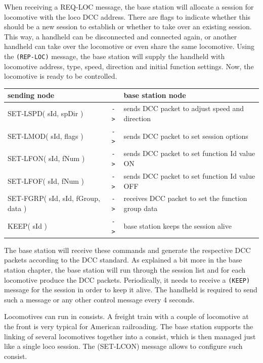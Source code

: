 When receiving a REQ-LOC message, the base station will allocate a session for locomotive with the loco DCC address. There are flags to indicate whether this should be a new session to establish or whether to take over an existing session. This way, a handheld can be disconnected and connected again, or another handheld can take over the locomotive or even share the same locomotive. Using the \texttt{(REP-LOC)} message, the base station will supply the handheld with locomotive address, type, speed, direction and initial function settings. Now, the locomotive is ready to be controlled.

\begin{table}[ht!]
    \begin{center}
        \begin{tabular}{|p{}| c |p{}|}
            \toprule
            \textbf{sending node} & & \textbf{ base station node } \\
            \midrule
            SET-LSPD( sId, spDir ) & \texttt{->} & sends DCC packet to adjust speed and direction  \\
            SET-LMOD( sId, flags ) & \texttt{->} & sends DCC packet to set session options   \\
            SET-LFON( sId, fNum ) & \texttt{->} & sends DCC packet to set function Id value ON  \\
            SET-LFOF( sId, fNum ) & \texttt{->} & sends DCC packet to set function Id value OFF  \\
            SET-FGRP( sId, sId, fGroup, data ) & \texttt{->} & receives DCC packet to set the function group data  \\
            KEEP( sId ) & \texttt{->} & base station keeps the session alive  \\
            \bottomrule
        \end{tabular}
    \end{center}
\end{table}

The base station will receive these commands and generate the respective DCC packets according to the DCC standard. As explained a bit more in the base station chapter, the base station will run through the session list and for each locomotive produce the DCC packets. Periodically, it needs to receive a \texttt{(KEEP)} message for the session in order to keep it alive. The handheld is required to send such a message or any other control message every 4 seconds.

Locomotives can run in consists. A freight train with a couple of locomotive at the front is very typical for American railroading. The base station supports the linking of several locomotives together into a consist, which is then managed just like a single loco session. The (SET-LCON) message allows to configure such consist.

